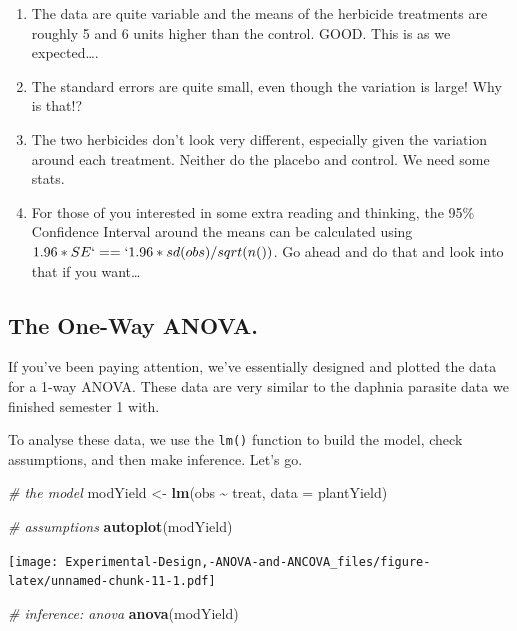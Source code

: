 \documentclass[
]{book}
\newenvironment{Shaded}{\begin{snugshade}}{\end{snugshade}}
\newcommand{\AttributeTok}[1]{\textcolor[rgb]{0.13,0.29,0.53}{#1}}
\newcommand{\CommentTok}[1]{\textcolor[rgb]{0.56,0.35,0.01}{\textit{#1}}}
\newcommand{\FunctionTok}[1]{\textcolor[rgb]{0.13,0.29,0.53}{\textbf{#1}}}
\newcommand{\NormalTok}[1]{#1}
\newcommand{\OtherTok}[1]{\textcolor[rgb]{0.56,0.35,0.01}{#1}}
\newcommand{\SpecialCharTok}[1]{\textcolor[rgb]{0.81,0.36,0.00}{\textbf{#1}}}
\providecommand{\tightlist}{%
  \setlength{\itemsep}{0pt}\setlength{\parskip}{0pt}}
\begin{document}
\begin{enumerate}
\def\labelenumi{\arabic{enumi}.}
\tightlist
\item
  The data are quite variable and the means of the herbicide treatments are roughly 5 and 6 units higher than the control. GOOD. This is as we expected\ldots.
\item
  The standard errors are quite small, even though the variation is large! Why is that!?
\item
  The two herbicides don't look very different, especially given the variation around each treatment. Neither do the placebo and control. We need some stats.
\item
  For those of you interested in some extra reading and thinking, the 95\% Confidence Interval around the means can be calculated using \(1.96*SE` == `1.96*sd(obs)/sqrt(n())\). Go ahead and do that and look into that if you want\ldots{}
\end{enumerate}

\hypertarget{the-one-way-anova.}{%
\subsection{The One-Way ANOVA.}\label{the-one-way-anova.}}

If you've been paying attention, we've essentially designed and plotted the data for a 1-way ANOVA. These data are very similar to the daphnia parasite data we finished semester 1 with.

To analyse these data, we use the \texttt{lm()} function to build the model, check assumptions, and then make inference. Let's go.

\begin{Shaded}
\begin{Highlighting}[]
\CommentTok{\# the model}
\NormalTok{modYield }\OtherTok{\textless{}{-}} \FunctionTok{lm}\NormalTok{(obs }\SpecialCharTok{\textasciitilde{}}\NormalTok{ treat, }\AttributeTok{data =}\NormalTok{ plantYield)}

\CommentTok{\# assumptions}
\FunctionTok{autoplot}\NormalTok{(modYield)}
\end{Highlighting}
\end{Shaded}

\texttt{[image: Experimental-Design,-ANOVA-and-ANCOVA\_files/figure-latex/unnamed-chunk-11-1.pdf]}

\begin{Shaded}
\begin{Highlighting}[]
\CommentTok{\# inference: anova}
\FunctionTok{anova}\NormalTok{(modYield)}
\end{Highlighting}
\end{Shaded}
\end{document}
